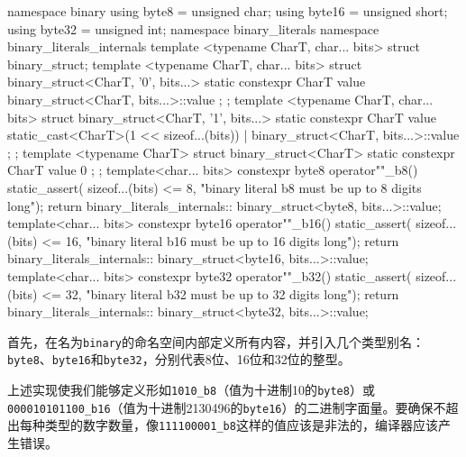 \begin{cpp}
namespace binary
{
    using byte8  = unsigned char;
    using byte16 = unsigned short;
    using byte32 = unsigned int;
    namespace binary_literals
    {
        namespace binary_literals_internals
        {
            template <typename CharT, char... bits>
            struct binary_struct;
            template <typename CharT, char... bits>
            struct binary_struct<CharT, '0', bits...>
            {
                static constexpr CharT value{
                    binary_struct<CharT, bits...>::value };
            };
            template <typename CharT, char... bits>
            struct binary_struct<CharT, '1', bits...>
            {
                static constexpr CharT value{
                    static_cast<CharT>(1 << sizeof...(bits)) |
                    binary_struct<CharT, bits...>::value };
            };
            template <typename CharT>
            struct binary_struct<CharT>
            {
                static constexpr CharT value{ 0 };
            };
        }
        template<char... bits>
        constexpr byte8 operator""_b8()
        {
            static_assert(
            sizeof...(bits) <= 8,
            "binary literal b8 must be up to 8 digits long");
            return binary_literals_internals::
            binary_struct<byte8, bits...>::value;
        }
        template<char... bits>
        constexpr byte16 operator""_b16()
        {
            static_assert(
            sizeof...(bits) <= 16,
            "binary literal b16 must be up to 16 digits long");
            return binary_literals_internals::
            binary_struct<byte16, bits...>::value;
        }
        template<char... bits>
        constexpr byte32 operator""_b32()
        {
            static_assert(
            sizeof...(bits) <= 32,
            "binary literal b32 must be up to 32 digits long");
            return binary_literals_internals::
            binary_struct<byte32, bits...>::value;
        }
    }
}
\end{cpp}


首先，在名为\verb|binary|的命名空间内部定义所有内容，并引入几个类型别名：\verb|byte8|、\verb|byte16|和\verb|byte32|，分别代表8位、16位和32位的整型。

上述实现使我们能够定义形如\verb|1010_b8|（值为十进制10的\verb|byte8|）或\verb|000010101100_b16|（值为十进制2130496的\verb|byte16|）的二进制字面量。要确保不超出每种类型的数字数量，像\verb|111100001_b8|这样的值应该是非法的，编译器应该产生错误。

